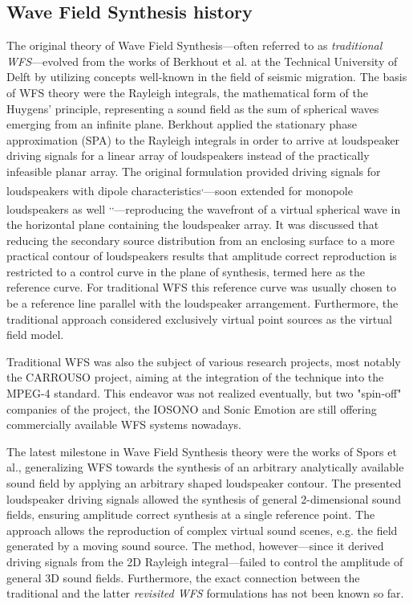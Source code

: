 \documentclass[10pt,twoside]{article}
\theoremstyle{thesisgroupstyle}
\theoremstyle{indented}
\begin{document}
\subsection{Wave Field Synthesis history}
%
The original theory of Wave Field Synthesis---often referred to as \emph{traditional WFS}---evolved from the works of Berkhout et al. at the Technical University of Delft by utilizing concepts well-known in the field of seismic migration.
The basis of WFS theory were the Rayleigh integrals, the mathematical form of the Huygens' principle, representing a sound field as the sum of spherical waves emerging from an infinite plane.
Berkhout applied the stationary phase approximation (SPA) to the Rayleigh integrals in order to arrive at loudspeaker driving signals for a linear array of loudspeakers instead of the practically infeasible planar array.
The original formulation provided driving signals for loudspeakers with dipole characteristics\textsuperscript{,}---soon extended for monopole loudspeakers as well \textsuperscript{,}\textsuperscript{,}---reproducing the wavefront of a virtual spherical wave in the horizontal plane containing the loudspeaker array.
It was discussed that reducing the secondary source distribution from an enclosing surface to a more practical contour of loudspeakers results that amplitude correct reproduction is restricted to a control curve in the plane of synthesis, termed here as the reference curve.
For traditional WFS this reference curve was usually chosen to be a reference line parallel with the loudspeaker arrangement.
Furthermore, the traditional approach considered exclusively virtual point sources as the virtual field model.

Traditional WFS was also the subject of various research projects, most notably the CARROUSO project, aiming at the integration of the technique into the MPEG-4 standard. This endeavor was not realized eventually, but two "spin-off" companies of the project, the IOSONO and Sonic Emotion are still offering commercially available WFS systems nowadays.

The latest milestone in Wave Field Synthesis theory were the works of Spors et al., generalizing WFS towards the synthesis of an arbitrary analytically available sound field by applying an arbitrary shaped loudspeaker contour.
The presented loudspeaker driving signals allowed the synthesis of general 2-dimensional sound fields, ensuring amplitude correct synthesis at a single reference point.
The approach allows the reproduction of complex virtual sound scenes, e.g. the field generated by a moving sound source.
The method, however---since it derived driving signals from the 2D Rayleigh integral---failed to control the amplitude of general 3D sound fields.
Furthermore, the exact connection between the traditional and the latter \emph{revisited WFS} formulations has not been known so far.
\end{document}
